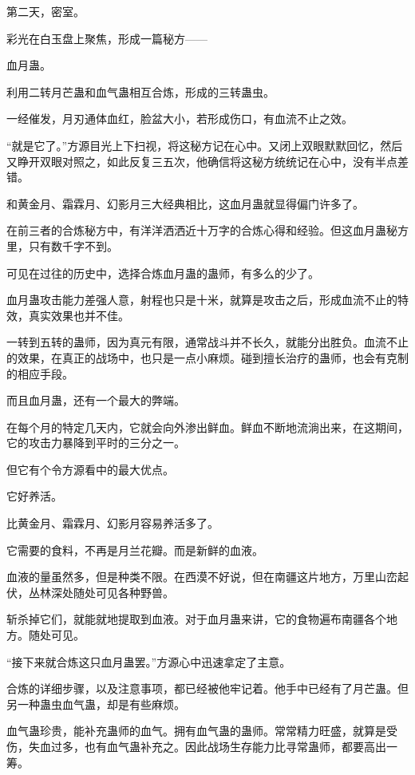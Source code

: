 
\begin{this_body}

第二天，密室。

彩光在白玉盘上聚焦，形成一篇秘方——

血月蛊。

利用二转月芒蛊和血气蛊相互合炼，形成的三转蛊虫。

一经催发，月刃通体血红，脸盆大小，若形成伤口，有血流不止之效。

“就是它了。”方源目光上下扫视，将这秘方记在心中。又闭上双眼默默回忆，然后又睁开双眼对照之，如此反复三五次，他确信将这秘方统统记在心中，没有半点差错。

和黄金月、霜霖月、幻影月三大经典相比，这血月蛊就显得偏门许多了。

在前三者的合炼秘方中，有洋洋洒洒近十万字的合炼心得和经验。但这血月蛊秘方里，只有数千字不到。

可见在过往的历史中，选择合炼血月蛊的蛊师，有多么的少了。

血月蛊攻击能力差强人意，射程也只是十米，就算是攻击之后，形成血流不止的特效，真实效果也并不佳。

一转到五转的蛊师，因为真元有限，通常战斗并不长久，就能分出胜负。血流不止的效果，在真正的战场中，也只是一点小麻烦。碰到擅长治疗的蛊师，也会有克制的相应手段。

而且血月蛊，还有一个最大的弊端。

在每个月的特定几天内，它就会向外渗出鲜血。鲜血不断地流淌出来，在这期间，它的攻击力暴降到平时的三分之一。

但它有个令方源看中的最大优点。

它好养活。

比黄金月、霜霖月、幻影月容易养活多了。

它需要的食料，不再是月兰花瓣。而是新鲜的血液。

血液的量虽然多，但是种类不限。在西漠不好说，但在南疆这片地方，万里山峦起伏，丛林深处随处可见各种野兽。

斩杀掉它们，就能就地提取到血液。对于血月蛊来讲，它的食物遍布南疆各个地方。随处可见。

“接下来就合炼这只血月蛊罢。”方源心中迅速拿定了主意。

合炼的详细步骤，以及注意事项，都已经被他牢记着。他手中已经有了月芒蛊。但另一种蛊虫血气蛊，却是有些麻烦。

血气蛊珍贵，能补充蛊师的血气。拥有血气蛊的蛊师。常常精力旺盛，就算是受伤，失血过多，也有血气蛊补充之。因此战场生存能力比寻常蛊师，都要高出一筹。


\end{this_body}
